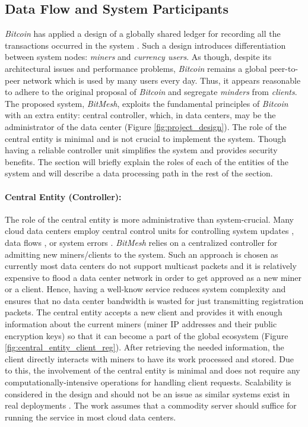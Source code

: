 \documentclass[11px]{article}
\newcommand{\projTitle}{BitMesh\xspace}
\begin{document}
\subsection{Data Flow and System Participants}
 \textit{Bitcoin} has applied a design of a globally shared ledger for recording all the transactions occurred in the system \cite{bitcoin_paper}. Such a design introduces differentiation between system nodes: \textit{miners} and \textit{currency users}. As though, despite its architectural issues and performance problems, \textit{Bitcoin} remains a global peer-to-peer network which is used by many users every day. Thus, it appears reasonable to adhere to the original proposal of \textit{Bitcoin} and segregate \textit{minders} from \textit{clients}. The proposed system, \textit{\projTitle}, exploits the fundamental principles of \textit{Bitcoin} with an extra entity: central controller, which, in data centers, may be the administrator of the data center (Figure \ref{fig:project_design}). The role of the central entity is minimal and is not crucial to implement the system. Though having a reliable controller unit simplifies the system and provides security benefits. The section will briefly explain the roles of each of the entities of the system and will describe a data processing path in the rest of the section.

\paragraph{Central Entity (Controller):} The role of the central entity is more administrative than system-crucial. Many cloud data centers employ central control units for controlling system updates \cite{microsoft-autopilot}, data flows \cite{google_jupiter}, or system errors \cite{microsoft_netpoirot}. \textit{\projTitle} relies on a centralized controller for admitting new miners/clients to the system. Such an approach is chosen as currently most data centers do not support multicast packets and it is relatively expensive to flood a data center network in order to get approved as a new miner or a client. Hence, having a well-know service reduces system complexity and ensures that no data center bandwidth is wasted for just transmitting registration packets. The central entity accepts a new client and provides it with enough information about the current miners (miner IP addresses and their public encryption keys) so that it can become a part of the global ecosystem (Figure \ref{fig:central_entity_client_reg}). After retrieving the needed information, the client directly interacts with miners to have its work processed and stored. Due to this, the involvement of the central entity is minimal and does not require any computationally-intensive operations for handling client requests. Scalability is considered in the design and should not be an issue as similar systems exist in real deployments \cite{hadoop_example}. The work assumes that a commodity server should suffice for running the service in most cloud data centers.
\end{document}
